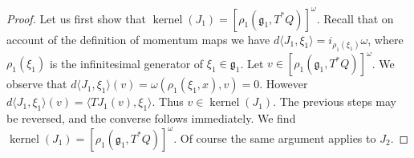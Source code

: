 \documentclass[12pt]{amsart}
\DeclareMathOperator{\kernel}{kernel}
\begin{document}
  \begin{proof}
    Let us first show that $\kernel(J_1) = [\rho_1(\mathfrak{g}_1 , T^*Q )]^\omega$.
    Recall that on account of the definition of momentum maps we have 
    $d \langle J_1 , \xi_1 \rangle = i_{\rho_1(\xi_1)} \omega$, 
    where $\rho_1(\xi_1)$ is the infinitesimal generator of
    $\xi_1 \in \mathfrak{g}_1$.
    Let $v \in [\rho_1(\mathfrak{g}_1,T^*Q)]^\omega$.
    We observe that 
    $d \langle J_1 , \xi_1 \rangle (v) = \omega( \rho_1(\xi_1, x ), v ) = 0$.
    However $d\langle J_1 , \xi_1 \rangle (v) = \langle TJ_1(v) , \xi_1 \rangle$.
    Thus $v \in \kernel(J_1)$.
    The previous steps may be reversed, and
    the converse follows immediately.
    We find
    $\kernel(J_1) = [\rho_1(\mathfrak{g}_1,T^*Q)]^\omega$.
    Of course the same argument applies to $J_2$.


\end{proof}
\end{document}
